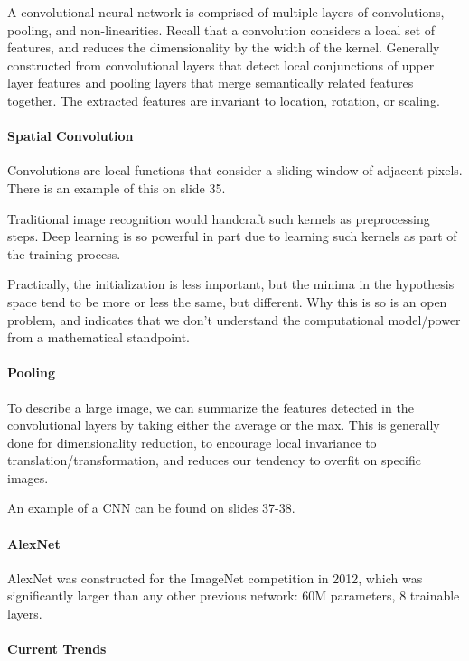 \documentclass{idc_msc}
\begin{document}
A convolutional neural network is comprised of multiple layers of convolutions, pooling, and non-linearities.
Recall that a convolution considers a local set of features, and reduces the dimensionality by the width of the kernel.
Generally constructed from convolutional layers that detect local conjunctions of upper layer features and pooling layers that merge semantically related features together.
The extracted features are invariant to location, rotation, or scaling.

\paragraph{Spatial Convolution}

Convolutions are local functions that consider a sliding window of adjacent pixels.
There is an example of this on slide 35.

Traditional image recognition would handcraft such kernels as preprocessing steps.
Deep learning is so powerful in part due to learning such kernels as part of the training process.

Practically, the initialization is less important, but the minima in the hypothesis space tend to be more or less the same, but different.
Why this is so is an open problem, and indicates that we don't understand the computational model/power from a mathematical standpoint.

\paragraph{Pooling}

To describe a large image, we can summarize the features detected in the convolutional layers by taking either the average or the max.
This is generally done for dimensionality reduction, to encourage local invariance to translation/transformation, and reduces our tendency to overfit on specific images.

An example of a CNN can be found on slides 37-38.

\paragraph{AlexNet}

AlexNet was constructed for the ImageNet competition in 2012, which was significantly larger than any other previous network: 60M parameters, 8 trainable layers.

\paragraph{Current Trends}
\end{document}
